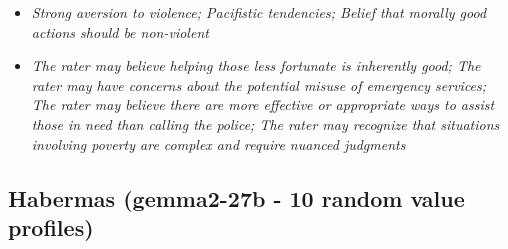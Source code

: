 \documentclass[11pt]{article}
\newcommand{\profiletext}[1]{\textit{#1}}
\begin{document}
\begin{itemize}
\item \profiletext{Strong aversion to violence; Pacifistic tendencies; Belief that morally good actions should be non-violent}
\item \profiletext{The rater may believe helping those less fortunate is inherently good; The rater may have concerns about the potential misuse of emergency services; The rater may believe there are more effective or appropriate ways to assist those in need than calling the police; The rater may recognize that situations involving poverty are complex and require nuanced judgments}
\end{itemize}

\subsection{Habermas (gemma2-27b - 10 random value profiles)}
\end{document}
